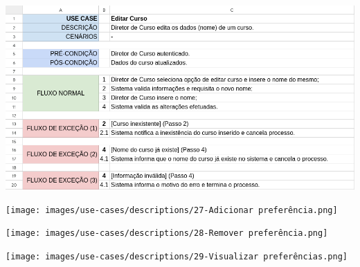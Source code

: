 \documentclass[a4paper,12pt]{scrreprt}
\begin{document}
\begin{minipage}{\textwidth}
    \centering
    \includegraphics[width=1\textwidth]{images/use-cases/descriptions/26-Editar Curso.png}
    \label{fig:3-26-editar_curso}
\end{minipage}

\begin{minipage}{\textwidth}
    \centering
    \texttt{[image: images/use-cases/descriptions/27-Adicionar preferência.png]}
    \label{fig:3-27-adicionar_preferencia}
\end{minipage}

\begin{minipage}{\textwidth}
    \centering
    \texttt{[image: images/use-cases/descriptions/28-Remover preferência.png]}
    \label{fig:3-28-remover_preferencia}
\end{minipage}

\begin{minipage}{\textwidth}
    \centering
    \texttt{[image: images/use-cases/descriptions/29-Visualizar preferências.png]}
    \label{fig:3-29-visualizar_preferencias}
\end{minipage}
\end{document}
